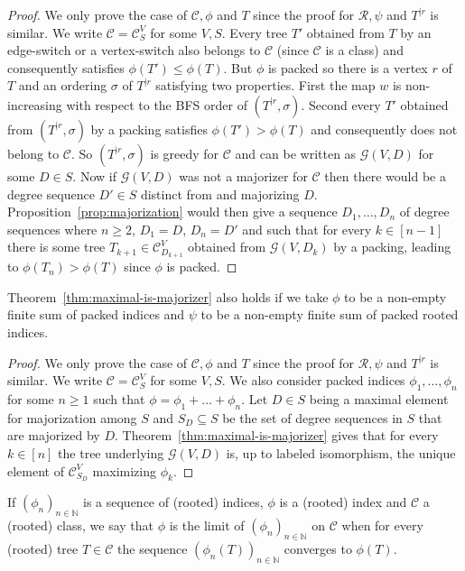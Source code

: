 \documentclass[11 pt]{modarticle}
\newcommand{\cN}{\mathbb{N}}
\newcommand{\wmap}{w}
\newcommand{\rtree}[2]{{#1}^{\lvert #2}}
\newcommand{\ortree}[3]{(\rtree{#1}{#2},{#3})}
\newcommand{\tclass}{\mathcal{C}}
\newcommand{\rtclass}{\mathcal{R}}
\newcommand{\smallpclass}[2]{\tclass^{#1}_{#2}}
\newcommand{\greedy}[2]{\mathcal{G}(#1,#2)}
\newcommand{\pclass}[2]{\tclass^{#1}_{#2}}
\begin{document}
\begin{proof}
We only prove the case of $\tclass, \phi$ and $T$ since the proof for $\rtclass, \psi$ and $\rtree{T}{r}$ is similar. We write $\tclass = \pclass{V}{S}$ for some $V,S$. Every tree $T'$ obtained from $T$ by an edge-switch or a vertex-switch also belongs to $\tclass$ (since $\tclass$ is a class) and consequently satisfies $\phi(T') \leq \phi(T)$. But $\phi$ is packed so there is a vertex $r$ of $T$ and an ordering $\sigma$ of $\rtree{T}{r}$ satisfying two properties. First the map $\wmap$ is non-increasing with respect to the BFS order of $\ortree{T}{r}{\sigma}$. Second every $T'$ obtained from $\ortree{T}{r}{\sigma}$ by a packing satisfies $\phi(T') > \phi(T)$ and consequently does not belong to $\tclass$. So $\ortree{T}{r}{\sigma}$ is greedy for $\tclass$ and can be written as $\greedy{V}{D}$ for some $D \in S$. Now if $\greedy{V}{D}$ was not a majorizer for $\tclass$ then there would be a degree sequence $D' \in S$ distinct from and majorizing $D$. Proposition~\ref{prop:majorization} would then give a sequence $D_1, \dots, D_n$ of degree sequences where $n \geq 2$, $D_1 = D$, $D_n = D'$ and such that for every $k \in [n-1]$ there is some tree $T_{k+1} \in \pclass{V}{D_{k+1}}$ obtained from $\greedy{V}{D_k}$ by a packing, leading to $\phi(T_n) > \phi(T)$ since $\phi$ is packed.
\end{proof}


\begin{cor}\label{cor:maximal-finite-sum}
Theorem~\ref{thm:maximal-is-majorizer} also holds if we take $\phi$ to be a non-empty finite sum of packed indices and $\psi$ to be a non-empty finite sum of packed rooted indices.
\end{cor}

\begin{proof}
We only prove the case of $\tclass, \phi$ and $T$ since the proof for $\rtclass, \psi$ and $\rtree{T}{r}$ is similar.  We write $\tclass = \pclass{V}{S}$ for some $V,S$. We also consider packed indices $\phi_1, \dots, \phi_n$ for some $n \geq 1$ such that $\phi = \phi_1 + \dots + \phi_n$. Let $D \in S$ being a maximal element for majorization among $S$ and $S_D \subseteq S$ be the set of degree sequences in $S$ that are majorized by $D$. Theorem~\ref{thm:maximal-is-majorizer} gives that for every $k \in [n]$ the tree underlying $\greedy{V}{D}$ is, up to labeled isomorphism, the unique element of $\smallpclass{V}{S_D}$ maximizing $\phi_k$.
\end{proof}

If $(\phi_n)_{n \in \cN}$ is a sequence of (rooted) indices, $\phi$ is a (rooted) index and $\tclass$ a (rooted) class, we say that $\phi$ is the limit of $(\phi_n)_{n \in \cN}$ on $\tclass$ when for every (rooted) tree $T \in \tclass$ the sequence $(\phi_n(T))_{n \in \cN}$ converges to $\phi(T)$.
\end{document}
